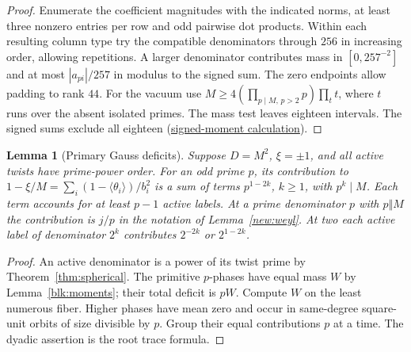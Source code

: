 \documentclass[11pt]{amsart}
\numberwithin{equation}{section}
\newtheorem{lemma}[theorem]{Lemma}
\theoremstyle{definition}
\theoremstyle{plain}
\newcommand{\supfile}[2]{\href{run:rank-bound-supplement/#1}{#2}}
\begin{document}
\begin{proof}
Enumerate the coefficient magnitudes with the indicated norms, at
least three nonzero entries per row and odd pairwise dot products.
Within each resulting column type try the compatible denominators
through $256$ in increasing order, allowing repetitions. A larger
denominator contributes mass in $[0,257^{-2}]$ and at most
$|a_{pi}|/257$ in modulus to the signed sum. The zero endpoints
allow padding to rank $44$. For the vacuum use
$M\ge4(\prod_{p\mid M,\,p>2}p)\prod_{t}t$, where $t$ runs over
the absent isolated primes. The mass test leaves eighteen intervals. The signed sums exclude all eighteen (\supfile{arithmetic/support_five_moments.py}{signed-moment calculation}).
\end{proof}

\begin{lemma}[Primary Gauss deficits]\label{round:deficits}
Suppose $D=M^2$, $\xi=\pm1$, and all active twists have prime-power
order. For an odd prime $p$, its contribution to
$1-\xi/M=\sum_i(1-\langle\theta_i\rangle)/b_i^2$ is a sum of
terms $p^{1-2k}$, $k\ge1$, with $p^k\mid M$. Each term accounts for
at least $p-1$ active labels. At a prime denominator $p$ with
$p\Vert M$ the contribution is $j/p$ in the notation of
Lemma~\ref{new:weyl}. At two each active label of denominator
$2^k$ contributes $2^{-2k}$ or $2^{1-2k}$.
\end{lemma}
\begin{proof}
An active denominator is a power of its twist prime by
Theorem~\ref{thm:spherical}. The primitive $p$-phases have equal mass
$W$ by Lemma~\ref{blk:moments}; their total deficit is $pW$.
Compute $W$ on the least numerous fiber. Higher phases have mean
zero and occur in same-degree square-unit orbits of size divisible
by $p$. Group their equal contributions $p$ at a time. The dyadic
assertion is the root trace formula.
\end{proof}
\end{document}
